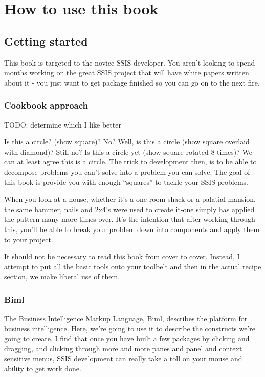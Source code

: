 \part{How to use this book}
\chapter{Getting started}
This book is targeted to the novice SSIS developer. You aren't looking to spend months working on the great SSIS project that will have white papers written about it - you just want to get package finished so you can go on to the next fire.

\section{Cookbook approach}
TODO: determine which I like better

Is this a circle? (show square)?
No? Well, is this a circle (show square overlaid with diamond)?
Still no? Is this a circle yet (show square rotated 8 times)?
We can at least agree this is a circle.
The trick to development then, is to be able to decompose problems you can’t solve into a problem you can solve. The goal of this book is provide you with enough “squares” to tackle your SSIS problems.

When you look at a house, whether it’s a one-room shack or a palatial mansion, the same hammer, nails and 2x4's were used to create it-one simply has applied the pattern many more times over. It’s the intention that after working through this, you’ll be able to break your problem down into components and apply them to your project. 

It should not be necessary to read this book from cover to cover. Instead, I attempt to put all the basic tools onto your toolbelt and then in the actual recipe section, we make liberal use of them.


\section{Biml}
The Business Intelligence Markup Language, Biml, describes the platform for business intelligence. Here, we're going to use it to describe the constructs we're going to create. I find that once you have built a few packages by clicking and dragging, and clicking through more and more panes and panel and context sensitive menus, SSIS development can really take a toll on your mouse and ability to get work done. 


